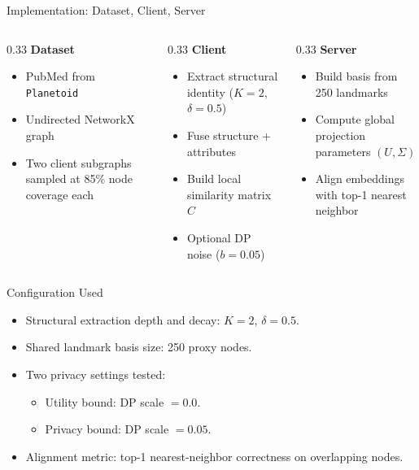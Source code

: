 \documentclass[11pt, aspectratio=169]{beamer}
\begin{document}
\begin{frame}{Implementation: Dataset, Client, Server}
    \begin{columns}[T]
        \begin{column}{0.33\textwidth}
            \textbf{Dataset}
            \begin{itemize}
                \item PubMed from \texttt{Planetoid}
                \item Undirected NetworkX graph
                \item Two client subgraphs sampled at 85\% node coverage each
            \end{itemize}
        \end{column}
        \begin{column}{0.33\textwidth}
            \textbf{Client}
            \begin{itemize}
                \item Extract structural identity ($K=2$, $\delta=0.5$)
                \item Fuse structure + attributes
                \item Build local similarity matrix $C$
                \item Optional DP noise ($b=0.05$)
            \end{itemize}
        \end{column}
        \begin{column}{0.33\textwidth}
            \textbf{Server}
            \begin{itemize}
                \item Build basis from 250 landmarks
                \item Compute global projection parameters $(U,\Sigma)$
                \item Align embeddings with top-1 nearest neighbor
            \end{itemize}
        \end{column}
    \end{columns}
\end{frame}

\begin{frame}{Configuration Used}
    \begin{itemize}
        \item Structural extraction depth and decay: $K=2$, $\delta=0.5$.
        \item Shared landmark basis size: 250 proxy nodes.
        \item Two privacy settings tested:
        \begin{itemize}
            \item Utility bound: DP scale $=0.0$.
            \item Privacy bound: DP scale $=0.05$.
        \end{itemize}
        \item Alignment metric: top-1 nearest-neighbor correctness on overlapping nodes.
    \end{itemize}
\end{frame}
\end{document}
